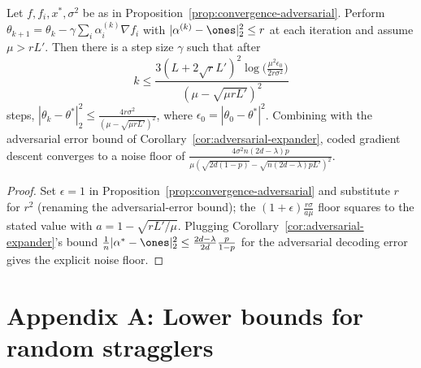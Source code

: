 \begin{corollary}[Noise floor with $\epsilon = 1$ {[Corollary VII.2]}]
  \label{cor:noise-floor}
  Let $f, f_i, x^*, \sigma^2$ be as in
  Proposition~\ref{prop:convergence-adversarial}. Perform
  $\theta_{k+1} = \theta_k - \gamma\sum_i \alpha_i^{(k)}\nabla f_i$ with
  $|\alpha^{(k)} - \ones|_2^2 \le r$ at each iteration and assume
  $\mu > rL'$. Then there is a step size $\gamma$ such that after
  \[
    k \le \frac{3(L + 2\sqrt r L')^2\log\big(\tfrac{\mu^2\epsilon_0}{2r\sigma^2}\big)}
      {(\mu - \sqrt{\mu rL'})^2}
  \]
  steps, $|\theta_k - \theta^*|_2^2 \le \tfrac{4r\sigma^2}{(\mu - \sqrt{\mu rL'})^2}$,
  where $\epsilon_0 = |\theta_0 - \theta^*|^2$. Combining with the adversarial
  error bound of Corollary~\ref{cor:adversarial-expander}, coded gradient descent
  converges to a noise floor of
  $\tfrac{4\sigma^2 n(2d-\lambda)p}{\mu(\sqrt{2d(1-p)} - \sqrt{n(2d-\lambda)pL'})^2}$.
\end{corollary}
\begin{proof}
  Set $\epsilon = 1$ in Proposition~\ref{prop:convergence-adversarial} and
  substitute $r$ for $r^2$ (renaming the adversarial-error bound); the
  $(1+\epsilon)\tfrac{r\sigma}{a\mu}$ floor squares to the stated value with
  $a = 1 - \sqrt{rL'/\mu}$. Plugging Corollary~\ref{cor:adversarial-expander}'s
  bound $\tfrac1n|\alpha^* - \ones|_2^2 \le \tfrac{2d-\lambda}{2d}\tfrac{p}{1-p}$
  for the adversarial decoding error gives the explicit noise floor.
\end{proof}

\chapter{Appendix A: Lower bounds for random stragglers}

